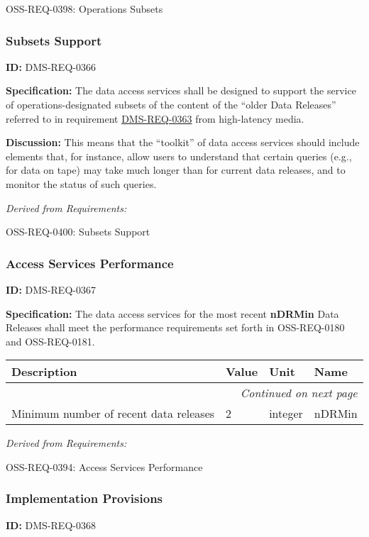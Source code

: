 \documentclass[SE,toc,lsstdraft]{lsstdoc}
\makeatletter
\newcommand{\paramname}[1]{\hspace{0pt}#1}
\newcommand{\unitname}[1]{\hspace{0pt}#1}
\newenvironment{parameters}[0]{%
\setlength\LTleft{0pt}
\setlength\LTright{\fill}
\begin{small}
\begin{longtable}[]{|p{0.49\textwidth}|l|p{0.6in}|p{1.70in}@{}|}

\hline \textbf{Description} & \textbf{Value} & \textbf{Unit} & \textbf{Name} \\ \hline
\endhead

\hline \multicolumn{4}{r}{\emph{Continued on next page}} \\
\endfoot

\hline\hline
\endlastfoot
}{%
\hline
\end{longtable}
\end{small}
}
\makeatother
\begin{document}
OSS-REQ-0398:
Operations Subsets \newline

\subsubsection{Subsets Support}

\label{DMS-REQ-0366}
\textbf{ID:} DMS-REQ-0366

\textbf{Specification:}
The data access services shall be designed to support the service of operations-designated subsets of the content of the “older Data Releases” referred to in requirement \hyperref[DMS-REQ-0363]{DMS-REQ-0363} from high-latency media.

\textbf{Discussion:}
This means that the “toolkit” of data access services should include elements that, for instance, allow users to understand that certain queries (e.g., for data on tape) may take much longer than for current data releases, and to monitor the status of such queries.

\emph{Derived from Requirements:}

OSS-REQ-0400:
Subsets Support \newline

\subsubsection{Access Services Performance}

\label{DMS-REQ-0367}
\textbf{ID:} DMS-REQ-0367

\textbf{Specification:}
The data access services for the most recent \textbf{nDRMin} Data Releases shall meet the performance requirements set forth in OSS-REQ-0180 and OSS-REQ-0181.

\begin{parameters}
Minimum number of recent data releases
&
2
&
\unitname{%
integer
}
&
\paramname{%
nDRMin
} \\\hline
\end{parameters}

\emph{Derived from Requirements:}

OSS-REQ-0394:
Access Services Performance \newline

\subsubsection{Implementation Provisions}

\label{DMS-REQ-0368}
\textbf{ID:} DMS-REQ-0368
\end{document}
